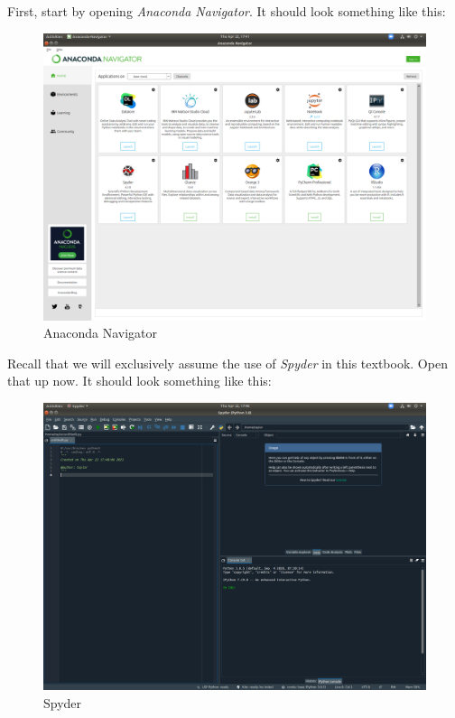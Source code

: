 \documentclass[
  12pt,
]{krantz}
\begin{document}
First, start by opening \emph{Anaconda Navigator}. It should look something like this:

\begin{figure}

{\centering \includegraphics[width=0.8\linewidth]{pics/anaconda_navigator} 

}

\caption{Anaconda Navigator}\label{fig:anaconda-navigator}
\end{figure}

Recall that we will exclusively assume the use of \emph{Spyder} in this textbook. Open that up now. It should look something like this:

\begin{figure}

{\centering \includegraphics[width=0.8\linewidth]{pics/spyder_screenshot} 

}

\caption{Spyder}\label{fig:spyder}
\end{figure}
\end{document}
